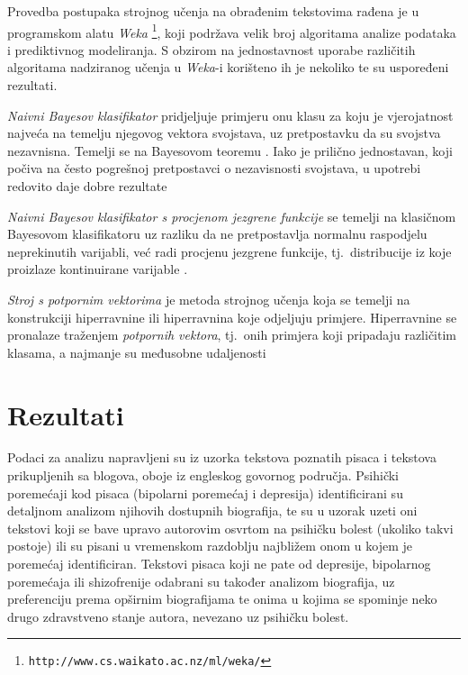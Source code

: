 \documentclass[10pt, a4paper]{article}
\begin{document}
Provedba postupaka strojnog učenja na obrađenim tekstovima rađena je u programskom alatu \emph{Weka} \footnote{\texttt{http://www.cs.waikato.ac.nz/ml/weka/}}, koji podržava velik broj algoritama analize podataka i prediktivnog modeliranja. S obzirom na jednostavnost uporabe različitih algoritama nadziranog učenja u \emph{Weka}-i korišteno ih je nekoliko te su uspoređeni rezultati.  

\emph{Naivni Bayesov klasifikator} pridjeljuje primjeru onu klasu za koju je vjerojatnost najveća na temelju njegovog vektora svojstava, uz pretpostavku da su svojstva nezavnisna. Temelji se na Bayesovom teoremu \citep{bayes-63}. Iako je prilično jednostavan, koji počiva na često pogrešnoj pretpostavci o nezavisnosti svojstava, u upotrebi redovito daje dobre rezultate \citep{hand-yu}

\emph{Naivni Bayesov klasifikator s procjenom jezgrene funkcije} se temelji na klasičnom Bayesovom klasifikatoru uz razliku da ne pretpostavlja normalnu raspodjelu neprekinutih varijabli, već radi procjenu jezgrene funkcije, tj.~distribucije iz koje proizlaze kontinuirane varijable \citep{john-95}.

\emph{Stroj s potpornim vektorima}  je metoda strojnog učenja koja se temelji na konstrukciji hiperravnine ili hiperravnina koje odjeljuju primjere. Hiperravnine se pronalaze traženjem \emph{potpornih vektora}, tj.~onih primjera koji pripadaju različitim klasama, a najmanje su međusobne udaljenosti \citep{cortes-vap}



\section{Rezultati}

Podaci za analizu napravljeni su iz uzorka tekstova poznatih pisaca i tekstova prikupljenih sa blogova, oboje iz engleskog govornog područja. Psihički poremećaji kod pisaca (bipolarni poremećaj i depresija) identificirani su detaljnom analizom njihovih dostupnih biografija, te su u uzorak uzeti oni tekstovi koji se bave upravo autorovim osvrtom na psihičku bolest (ukoliko takvi postoje) ili su pisani u vremenskom razdoblju najbližem onom u kojem je poremećaj identificiran. Tekstovi pisaca koji ne pate od depresije, bipolarnog poremećaja ili shizofrenije odabrani su također analizom biografija, uz preferenciju prema opširnim biografijama te onima u kojima se spominje neko drugo zdravstveno stanje autora, nevezano uz psihičku bolest.
\end{document}
